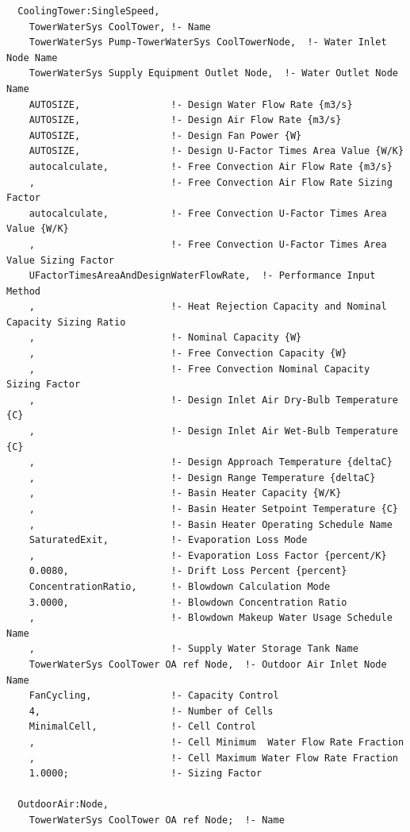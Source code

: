 \begin{lstlisting}
  CoolingTower:SingleSpeed,
    TowerWaterSys CoolTower, !- Name
    TowerWaterSys Pump-TowerWaterSys CoolTowerNode,  !- Water Inlet Node Name
    TowerWaterSys Supply Equipment Outlet Node,  !- Water Outlet Node Name
    AUTOSIZE,                !- Design Water Flow Rate {m3/s}
    AUTOSIZE,                !- Design Air Flow Rate {m3/s}
    AUTOSIZE,                !- Design Fan Power {W}
    AUTOSIZE,                !- Design U-Factor Times Area Value {W/K}
    autocalculate,           !- Free Convection Air Flow Rate {m3/s}
    ,                        !- Free Convection Air Flow Rate Sizing Factor
    autocalculate,           !- Free Convection U-Factor Times Area Value {W/K}
    ,                        !- Free Convection U-Factor Times Area Value Sizing Factor
    UFactorTimesAreaAndDesignWaterFlowRate,  !- Performance Input Method
    ,                        !- Heat Rejection Capacity and Nominal Capacity Sizing Ratio
    ,                        !- Nominal Capacity {W}
    ,                        !- Free Convection Capacity {W}
    ,                        !- Free Convection Nominal Capacity Sizing Factor
    ,                        !- Design Inlet Air Dry-Bulb Temperature {C}
    ,                        !- Design Inlet Air Wet-Bulb Temperature {C}
    ,                        !- Design Approach Temperature {deltaC}
    ,                        !- Design Range Temperature {deltaC}
    ,                        !- Basin Heater Capacity {W/K}
    ,                        !- Basin Heater Setpoint Temperature {C}
    ,                        !- Basin Heater Operating Schedule Name
    SaturatedExit,           !- Evaporation Loss Mode
    ,                        !- Evaporation Loss Factor {percent/K}
    0.0080,                  !- Drift Loss Percent {percent}
    ConcentrationRatio,      !- Blowdown Calculation Mode
    3.0000,                  !- Blowdown Concentration Ratio
    ,                        !- Blowdown Makeup Water Usage Schedule Name
    ,                        !- Supply Water Storage Tank Name
    TowerWaterSys CoolTower OA ref Node,  !- Outdoor Air Inlet Node Name
    FanCycling,              !- Capacity Control
    4,                       !- Number of Cells
    MinimalCell,             !- Cell Control
    ,                        !- Cell Minimum  Water Flow Rate Fraction
    ,                        !- Cell Maximum Water Flow Rate Fraction
    1.0000;                  !- Sizing Factor

  OutdoorAir:Node,
    TowerWaterSys CoolTower OA ref Node;  !- Name

\end{lstlisting}

